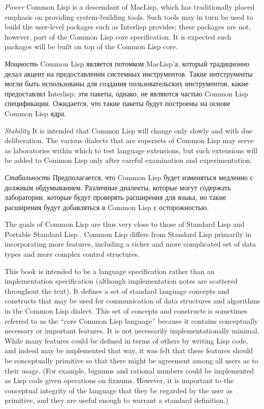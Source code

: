 \begin{flushdesc}
\item[{\it Power}]
Common Lisp is a descendant of MacLisp, which has
traditionally placed emphasis on providing system-building tools.
Such tools may in turn be used to build the user-level packages
such as Interlisp provides; these packages are not, however, part
of the Common Lisp core specification.  It is expected such packages will
be built on top of the Common Lisp core.

\item[{\it Мощность}]
Common Lisp является потомком MacLisp'а, который традиционно делал
акцент на предоставлении системных инструментов. Такие интструменты
могли быть использованы для создания пользовательских
инструментов, какие предоставлял Interlisp; эти пакеты, однако, не
являются частью Common Lisp спецификации. Ожидается, что
такие пакеты будут построены на основе Common Lisp ядра.

\item[{\it Stability}]
It is intended that Common Lisp
will change only slowly and with due deliberation.  The various dialects
that are supersets of Common Lisp may serve as laboratories within which to
test language extensions, but such extensions will be added to
Common Lisp only after careful examination and experimentation.

\item[{\it Стабильность}]
Предполагается, что Common Lisp будет изменяться медленно с
должным обдумыванием. Различные диалекты, которые могут содержать
лаборатории, которые будут проверять расширения для языка, но
такие расширения будут добавляться в Common Lisp с осторожностью.
\end{flushdesc}


The goals of Common Lisp are thus very close to those of Standard Lisp
\cite{STANDARD-LISP-REPORT} and Portable Standard Lisp \cite{PSL-MANUAL}.
Common Lisp differs from Standard Lisp
primarily in incorporating more features, including a
richer and more complicated set of data types and more complex
control structures.

This book is intended to be a language specification
rather than an implementation specification
(although implementation notes are scattered throughout the text).
It defines a set of
standard language concepts and constructs that may be used
for communication of data structures and algorithms in the Common Lisp
dialect.  This set of concepts
and constructs is sometimes referred to as the ``core Common Lisp language''
because it contains conceptually necessary or important features.
It is not necessarily implementationally minimal.
While many features could be defined in terms of others
by writing Lisp code, and indeed may be implemented that way,
it was felt that these features should be conceptually primitive
so that there might be agreement among all users as to their usage.
(For example, bignums and rational numbers could be implemented as
Lisp code given operations on fixnums.  However, it is important
to the conceptual integrity of the language that they be regarded
by the user as primitive, and they are useful enough to warrant
a standard definition.)

